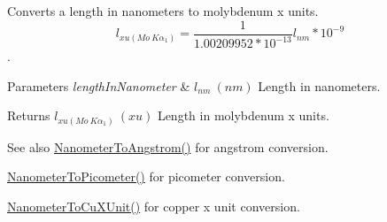 Converts a length in nanometers to molybdenum x units. \[ l_{xu(Mo\ K\alpha_1)}=\frac{1}{1.00209952*10^{-13}} l_{nm} * 10^{-9}\]. 


\begin{DoxyParams}{Parameters}
{\em length\+In\+Nanometer} & $ l_{nm}\ (nm)$ Length in nanometers. \\
\hline
\end{DoxyParams}
\begin{DoxyReturn}{Returns}
$ l_{xu(Mo\ K\alpha_1)}\ (xu)$ Length in molybdenum x units. 
\end{DoxyReturn}
\begin{DoxySeeAlso}{See also}
\mbox{\hyperlink{group___e_g_x_math-_conversions-_length_conversions-_s_i-_nanometer-_non-_s_i_ga7e2062d4cc1a422e54da597c4413efb1}{Nanometer\+To\+Angstrom()}} for angstrom conversion. 

\mbox{\hyperlink{group___e_g_x_math-_conversions-_length_conversions-_s_i-_nanometer-_s_i_gaba1e9bf91f6e065f8ba8be8dd039b499}{Nanometer\+To\+Picometer()}} for picometer conversion. 

\mbox{\hyperlink{group___e_g_x_math-_conversions-_length_conversions-_s_i-_nanometer-_non-_s_i_ga59399657caa5a9c81df2ffbe1ff7683c}{Nanometer\+To\+Cu\+X\+Unit()}} for copper x unit conversion. 
\end{DoxySeeAlso}
